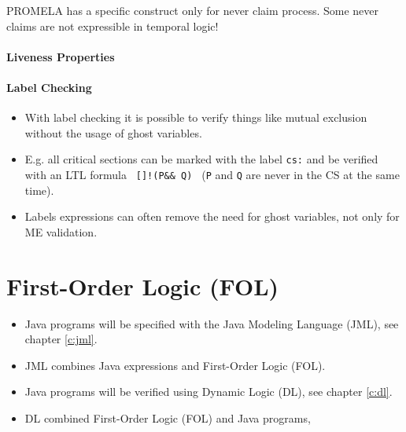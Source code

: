 \documentclass[a4paper, 11pt, accentcolor = tud3b]{tudreport}
\begin{document}
						PROMELA has a specific construct only for never claim process. Some never claims are not expressible in temporal logic!

				\subsubsection{Liveness Properties} %

				\subsubsection{Label Checking}
					\begin{itemize}
						\item With label checking it is possible to verify things like mutual exclusion without the usage of ghost variables.
						\item E.g. all critical sections can be marked with the label \texttt{cs:} and be verified with an LTL formula \texttt{ []!(P\@cs \&\& Q\@cs) } (\texttt{P} and \texttt{Q} are never in the CS at the same time).
						\item Labels expressions can often remove the need for ghost variables, not only for ME validation.
					\end{itemize}
		

	\chapter{First-Order Logic (FOL)}
		\begin{itemize}
			\item Java programs will be specified with the Java Modeling Language (JML), see chapter \ref{c:jml}.
			\item JML combines Java expressions and First-Order Logic (FOL).
			\item Java programs will be verified using Dynamic Logic (DL), see chapter \ref{c:dl}.
			\item DL combined First-Order Logic (FOL) and Java programs,
		\end{itemize}
	
\end{document}
